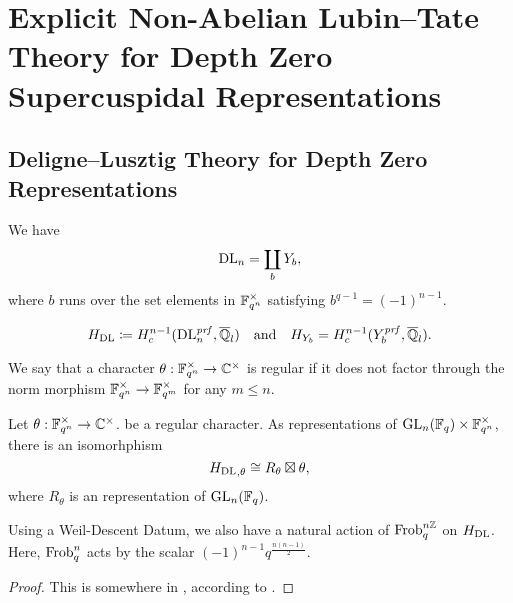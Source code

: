 \documentclass[../main.tex]{subfiles}
\begin{document}
\section{Explicit Non-Abelian Lubin--Tate Theory for Depth Zero Supercuspidal
Representations} %
\label{sec:Explicit Non-Abelian Lubin-Tate Theory for Depth Zero Supercuspidal Representations}


\subsection{Deligne--Lusztig Theory for Depth Zero Representations} %
\label{sub:Deligne-Lusztig Theory for Depth Zero Representations}
\begin{defi}\label{def:DLVariety}
  \todo{}
\end{defi}

\begin{lem}
  We have $$\mathrm{DL}_n = \coprod_{b} Y_b,$$
  where $b$ runs over the set elements in $\mathbb{F}_{q^n}^\times$ satisfying 
  $b^{q-1} = (-1)^{n-1}$. 
\end{lem}

\begin{equation} \label{eq:defDLCohom}
  H_\mathrm{DL} \coloneqq H^{n-1}_c(\mathrm{DL}_n^{\mathit{prf}}, \overline {\mathbb{Q}}_l) \quad \text{and} \quad
  H_{Y_b} = H^{n-1}_c(Y_b^{\mathit{prf}}, \overline {\mathbb{Q}}_l).
\end{equation}

\begin{defi}
  We say that a character $\theta: \mathbb{F}_{q^n}^\times \to \mathbb{C}^\times$ is 
  regular if it does not factor through the norm morphism
  $\mathbb{F}_{q^n}^\times \to \mathbb{F}_{q^m}^\times$ for any $m \leq n$.
\end{defi}

\begin{prop} \label{prop:DLCorrespondence}
  Let $\theta: \mathbb{F}_{q^n}^\times \to \mathbb{C}^\times$. be a regular character.
  As representations of $\operatorname{GL}_n(\mathbb{F}_q) \times \mathbb{F}_{q^n}^\times$, there is an
  isomorhphism 
  \begin{equation*}
    {H_\mathrm{DL}}_{, \theta} \cong  R_\theta \boxtimes \theta,
  \end{equation*}
  where $R_\theta$ is an  representation of $\operatorname{GL}_n(\mathbb{F}_q)$. 
\end{prop}

\begin{prop}
  Using a  Weil-Descent Datum, we also have a natural
  action of $\operatorname{Frob}_q^{n\mathbb{Z}}$ on $H_\mathrm{DL}$. Here, $\operatorname{Frob}_q^n$ acts by the scalar
  $(-1)^{n-1} q^{\frac{n(n-1)}2}$. 
  \begin{proof}
    This is somewhere in \cite{digne1985fonctions}, according to \cite[Lemma
    5.10]{mieda2016geometric}.
  \end{proof}
\end{prop}
\end{document}
